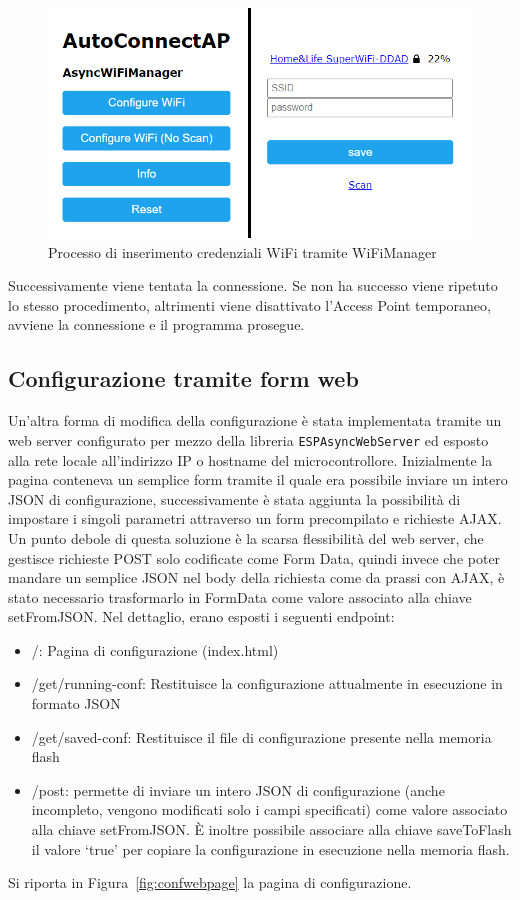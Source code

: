 \documentclass[12pt,a4paper]{report}
\begin{document}
\begin{figure}[h]
  \centering
  \includegraphics[width=\textwidth]{autoconnectap}
  \caption{Processo di inserimento credenziali WiFi tramite WiFiManager}
  \label{fig:autoconnectap}
\end{figure}

Successivamente viene tentata la connessione. Se non ha successo viene ripetuto lo stesso procedimento, altrimenti viene disattivato
l'Access Point temporaneo, avviene la connessione e il programma prosegue.

\subsection{Configurazione tramite form web}
Un'altra forma di modifica della configurazione è stata implementata tramite un web server configurato per mezzo della libreria
\texttt{ESPAsyncWebServer} ed esposto alla rete locale all'indirizzo IP o hostname del microcontrollore.
 Inizialmente la pagina conteneva un semplice form tramite il quale era possibile inviare un intero JSON
di configurazione, successivamente è stata aggiunta la possibilità di impostare i singoli parametri attraverso un form precompilato
e richieste AJAX. Un punto debole di questa soluzione è la scarsa flessibilità del web server, che gestisce richieste POST solo codificate
come Form Data, quindi invece che poter mandare un semplice JSON nel body della richiesta come da prassi con AJAX, è stato necessario
trasformarlo in FormData come valore associato alla chiave setFromJSON.
Nel dettaglio, erano esposti i seguenti endpoint:
\begin{itemize}
  \item /: Pagina di configurazione (index.html)
  \item /get/running-conf: Restituisce la configurazione attualmente in esecuzione in formato JSON
  \item /get/saved-conf: Restituisce il file di configurazione presente nella memoria flash
  \item /post: permette di inviare un intero JSON di configurazione (anche incompleto, vengono modificati solo i campi specificati) come
        valore associato alla chiave setFromJSON. È inoltre possibile associare alla chiave saveToFlash il valore `true' per copiare
        la configurazione in esecuzione nella memoria flash.
\end{itemize}
\noindent Si riporta in Figura~\ref{fig:confwebpage} la pagina di configurazione. 
\end{document}
